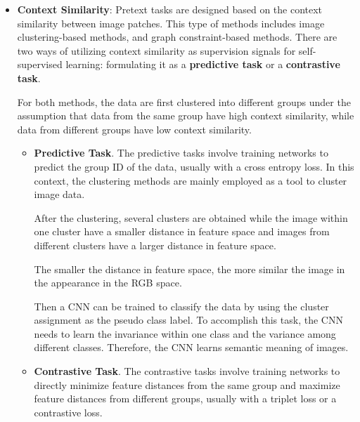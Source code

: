 \begin{itemize}
      \item \textbf{Context Similarity}: Pretext tasks are designed based on the
            context similarity between image patches. This type of methods includes
            image clustering-based methods, and graph constraint-based methods.
            There are two ways of utilizing context similarity as supervision
            signals for self-supervised learning: formulating it as a \textbf{
                  predictive task} or a \textbf{contrastive task}.

            For both methods, the data are first clustered into different groups
            under the assumption that data from the same group have high context
            similarity, while data from different groups have low context similarity.
            \begin{itemize}
                  \item \textbf{Predictive Task}. The predictive tasks involve
                        training networks to predict the group ID of the data,
                        usually with a cross entropy loss. In this context, the
                        clustering methods are mainly employed as a tool to cluster
                        image data.

                        After the clustering, several clusters are obtained while
                        the image within one cluster have a smaller distance in
                        feature space and images from different clusters have a
                        larger distance in feature space.

                        The smaller the distance in feature space, the more
                        similar the image in the appearance in the RGB space.

                        Then a CNN can be trained to classify the data by using
                        the cluster assignment as the pseudo class label. To
                        accomplish this task, the CNN needs to learn the invariance
                        within one class and the variance among different classes.
                        Therefore, the CNN learns semantic meaning of images.
                  \item \textbf{Contrastive Task}. The contrastive tasks involve
                        training networks to directly minimize feature distances
                        from the same group and maximize feature distances from
                        different groups, usually with a triplet loss or a
                        contrastive loss.


\end{itemize}
\end{itemize}
